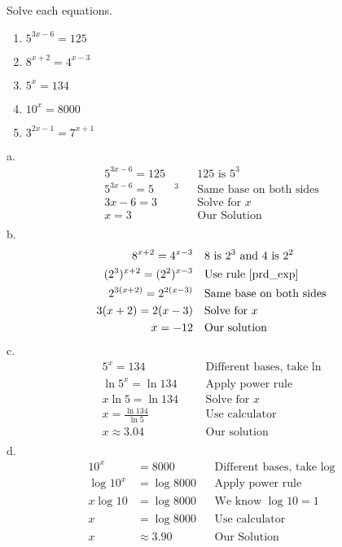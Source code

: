 \begin{exa}
	Solve each equations.
	\begin{enumerate}[\bfseries a.]
	    \item $5^{3x-6} = 125$
	    \item $8^{x+2} =4^{x-3}$
	    \item $5^x =134$
	    \item $10^x = 8000$
	    \item $3^{2x-1} = 7^{x+1}$
	\end{enumerate}
%
a.	\begin{align*}
		5^{3x-6} = 125&		&&\text{125 is $5^3$}\\
		5^{3x-6} = 5&^3		&&\text{Same base on both sides}\\
		3x-6 = 3&			&&\text{Solve for $x$}\\
		x =3&				&&\text{Our Solution}\\
	\end{align*}
b.	\begin{align*}
		8^{x+2}=4^{x-3}&		&&\text{8 is $2^3$ and 4 is $2^2$}\\
		(2^3)^{x+2}=(2^2)^{x-3}&		&&\text{Use rule \eqref{prd_exp}}\\
		2^{3(x+2)}=2^{2(x-3)}&		&&\text{Same base on both sides}\\
		3(x+2)=2(x-3)&			&&\text{Solve for $x$}\\
		x =-12&					&&\text{Our solution}\\
	\end{align*}
c.	\begin{align*}
		5^x=134&				&&\text{Different bases, take ln}\\
		\ln{5^x}=\ln{134}&	&&\text{Apply power rule}\\
		x\ln{5}=\ln{134}&	&&\text{Solve for $x$}\\
		x = \frac{\ln{134}}{\ln{5}}&		&&\text{Use calculator}\\
		x \approx3.04&		&&\text{Our solution} \\
	\end{align*}
d.	\begin{align*}
	    10^x &= 8000			&&\text{Different bases, take log}\\
		\log_{}10^x &= \log_{}8000		&&\text{Apply power rule}\\
		x\log_{}10 &= \log_{}8000		&&\text{We know $\log_{}10=1$}\\
		x &= \log_{}8000					&&\text{Use calculator}\\
		x &\approx3.90					&&\text{Our Solution}

\end{align*}
\end{exa}
